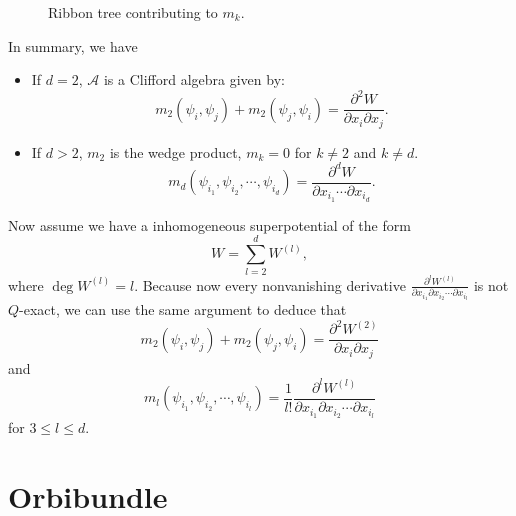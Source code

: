\documentclass[a4paper,11pt]{article}
\def\cA{\mathcal{A}}
\numberwithin{equation}{section}
\begin{document}
\begin{figure}
\centering
 \caption{Ribbon tree contributing to $m_k$.}\label{fig:treek}
\end{figure}
In summary, we have
\begin{itemize}
\item If $d=2$, $\cA$ is a Clifford algebra given by:
\[
m_2(\psi_i,\psi_j)+m_2(\psi_j,\psi_i) = \frac{\partial^2 W}{\partial x_i 
\partial x_j}.
\]
\item If $d>2$, $m_2$ is the wedge product, $m_k=0$ for $k \neq 2$ and $k \neq d$.
\[
m_d(\psi_{i_1},\psi_{i_2},\cdots,\psi_{i_d}) = \frac{\partial^d W}{\partial 
x_{i_1} \cdots \partial x_{i_d}}.
\]
\end{itemize}
Now assume we have a inhomogeneous superpotential of the form
\[
W = \sum_{l=2}^d W^{(l)},
\]
where $\deg W^{(l)} = l$. Because now every nonvanishing derivative 
$\frac{\partial^l W^{(l)}}{\partial x_{i_1} \partial x_{i_2} \cdots \partial 
x_{i_l}}$ is not $Q$-exact, we can use the same argument to deduce that
\begin{equation}\label{eqsinhomog1}
m_2 (\psi_i,\psi_j) + m_2(\psi_j,\psi_i) = \frac{\partial^2 W^{(2)}}{\partial 
x_i \partial x_j}
\end{equation}
and
\begin{equation}\label{eqsinhomog2}
m_l (\psi_{i_1},\psi_{i_2},\cdots,\psi_{i_l}) = \frac{1}{l!} \frac{\partial^l 
W^{(l)}}{\partial x_{i_1} \partial x_{i_2} \cdots \partial x_{i_l}}
\end{equation}
for $3 \leq l \leq d$.

\section{Orbibundle}\label{app:orbibundle}
\end{document}
